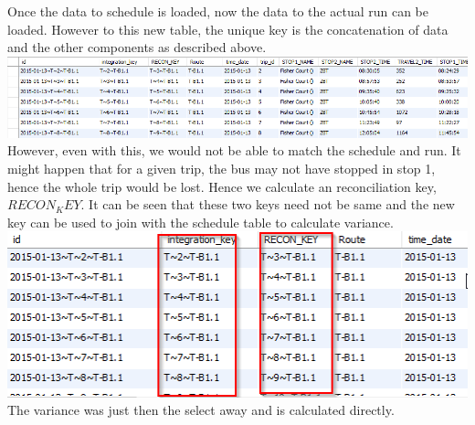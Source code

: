 \documentclass[12pt]{article}
\begin{document}
Once the data to schedule is loaded, now the data to the actual run can be loaded. However to this new table, the unique key is the concatenation of data and the other components as described above. \\
\includegraphics[scale=0.6]{resources/wh2}\\[1cm] 
However, even with this, we would not be able to match the schedule and run. It might happen that for a given trip, the bus may not have stopped in stop 1, hence the whole trip would be lost. Hence we calculate an reconciliation key, $RECON_KEY$. It can be seen that these two keys need not be same and the new key can be used to join with the schedule table to calculate variance. \\
\includegraphics[scale=0.6]{resources/wh3}\\[1cm] 
The variance was just then the select away and is calculated directly.

\end{document}
